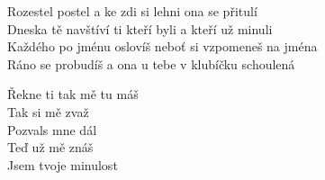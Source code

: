 \begin{text}
Rozestel postel a ke zdi si lehni ona se přitulí\\
Dneska tě navštíví ti kteří byli a kteří už minuli\\
Každého po jménu oslovíš neboť si vzpomeneš na jména\\
Ráno se probudíš a ona u tebe v klubíčku schoulená

Řekne ti tak mě tu máš \\
Tak si mě zvaž\\
Pozvals mne dál \\
Teď už mě znáš\\
Jsem tvoje minulost
\end{text}